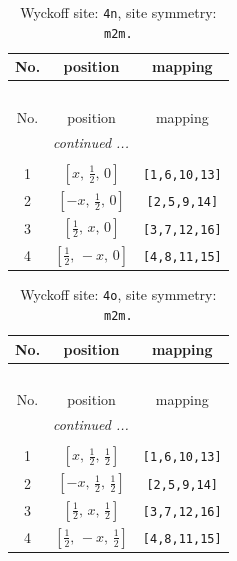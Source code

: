 \documentclass[fleqn,8pt]{jsarticle}
\begin{document}
\renewcommand{\arraystretch}{1.2}
\begin{longtable}{ccc}
\caption{Wyckoff site: {\tt 4n}, site symmetry: {\tt m2m.}}
 \\
 \hline \hline
No. & position & mapping \\ \hline \endfirsthead

\multicolumn{2}{l}{\tablename\ \thetable{}} \\
 \hline \hline
No. & position & mapping \\ \hline \endhead

 \hline \hline
\multicolumn{2}{r}{\footnotesize\it continued ...} \\ \endfoot

 \hline \hline
\multicolumn{2}{r}{} \\ \endlastfoot

1 & $\left[ x,\, \frac{1}{2},\, 0 \right]$ & {\tt [1,6,10,13]} \\ \hline
2 & $\left[ - x,\, \frac{1}{2},\, 0 \right]$ & {\tt [2,5,9,14]} \\ \hline
3 & $\left[ \frac{1}{2},\, x,\, 0 \right]$ & {\tt [3,7,12,16]} \\ \hline
4 & $\left[ \frac{1}{2},\, - x,\, 0 \right]$ & {\tt [4,8,11,15]} \\
\end{longtable}
\renewcommand{\arraystretch}{1.2}
\begin{longtable}{ccc}
\caption{Wyckoff site: {\tt 4o}, site symmetry: {\tt m2m.}}
 \\
 \hline \hline
No. & position & mapping \\ \hline \endfirsthead

\multicolumn{2}{l}{\tablename\ \thetable{}} \\
 \hline \hline
No. & position & mapping \\ \hline \endhead

 \hline \hline
\multicolumn{2}{r}{\footnotesize\it continued ...} \\ \endfoot

 \hline \hline
\multicolumn{2}{r}{} \\ \endlastfoot

1 & $\left[ x,\, \frac{1}{2},\, \frac{1}{2} \right]$ & {\tt [1,6,10,13]} \\ \hline
2 & $\left[ - x,\, \frac{1}{2},\, \frac{1}{2} \right]$ & {\tt [2,5,9,14]} \\ \hline
3 & $\left[ \frac{1}{2},\, x,\, \frac{1}{2} \right]$ & {\tt [3,7,12,16]} \\ \hline
4 & $\left[ \frac{1}{2},\, - x,\, \frac{1}{2} \right]$ & {\tt [4,8,11,15]} \\
\end{longtable}
\end{document}
